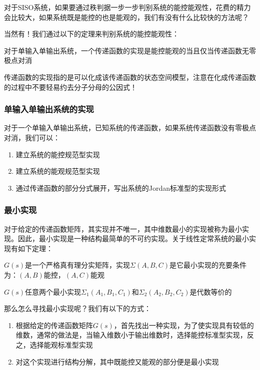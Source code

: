 对于SISO系统，如果要通过秩判据一步一步判别系统的能控能观性，花费的精力会比较大，如果系统既是能控的也是能观的，我们有没有什么比较快的方法呢？

当然有！我们通过以下的定理来判别系统的能控能观性：
\begin{theorem}
    对于单输入单输出系统，一个传递函数的实现是能控能观的当且仅当传递函数无零极点对消
    \begin{marker}
        传递函数的实现指的是可以化成该传递函数的状态空间模型，注意在化成传递函数的过程中不要轻易约去分子分母的公因式！
    \end{marker}
\end{theorem}

\subsubsection{单输入单输出系统的实现}

对于一个单输入单输出系统，已知系统的传递函数，如果系统传递函数没有零极点对消，我们可以：
\begin{enumerate}
    \item 建立系统的能控规范型实现
    \item 建立系统的能观规范型实现
    \item 通过传递函数的部分分式展开，写出系统的Jordan标准型的实现形式
\end{enumerate}

\subsubsection{最小实现}

对于给定的传递函数矩阵，其实现并不唯一，其中维数最小的实现被称为最小实现。因此，最小实现是一种结构最简单的不可约实现。关于线性定常系统的最小实现有如下定理：
\begin{theorem}
    $G(s)$是一个严格真有理分实矩阵，实现$\Sigma(A,B,C)$是它最小实现的充要条件为：$(A,B)$能控，$(A,C)$能观  
\end{theorem}

\begin{theorem}
    $G(s)$任意两个最小实现$\Sigma_1(A_1,B_1,C_1)$和$\Sigma_2(A_2,B_2,C_2)$是代数等价的
\end{theorem}

那么怎么寻找最小实现呢？我们有以下的方式：
\begin{enumerate}
    \item 根据给定的传递函数矩阵$G(s)$，首先找出一种实现，为了使实现具有较低的维数，通常的做法是，当输入维数小于输出维数时，选择能控标准型实现，反之，选择能观标准型实现
    \item 对这个实现进行结构分解，其中既能控又能观的部分便是最小实现
\end{enumerate}


